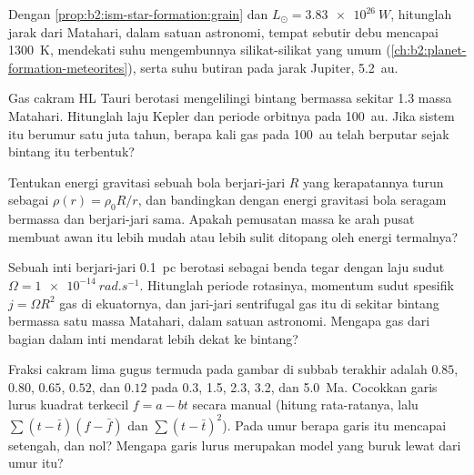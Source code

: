 \begin{exercise}[$\star\star$]\label{exo:b2:ism-star-formation:8}
Dengan \cref{prop:b2:ism-star-formation:grain} dan $L_\odot = \qty{3.83e26}{W}$,
hitunglah jarak dari Matahari, dalam satuan astronomi, tempat sebutir debu
mencapai \qty{1300}{K}, mendekati suhu mengembunnya silikat-silikat yang umum
(\cref{ch:b2:planet-formation-meteorites}), serta
suhu butiran pada jarak Jupiter, \qty{5.2}{au}.
\end{exercise}

\begin{exercise}[$\star\star$]\label{exo:b2:ism-star-formation:9}
Gas cakram HL Tauri berotasi mengelilingi bintang bermassa sekitar \num{1.3} massa
Matahari. Hitunglah laju Kepler dan periode orbitnya pada \qty{100}{au}.
Jika sistem itu berumur satu juta tahun, berapa kali gas pada
\qty{100}{au} telah berputar sejak bintang itu terbentuk?
\end{exercise}

\begin{exercise}[$\star\star\star$]\label{exo:b2:ism-star-formation:10}
Tentukan energi gravitasi sebuah bola berjari-jari $R$ yang kerapatannya
turun sebagai $\rho(r) = \rho_0 R/r$, dan bandingkan dengan energi gravitasi bola seragam
bermassa dan berjari-jari sama. Apakah pemusatan massa ke arah pusat membuat
awan itu lebih mudah atau lebih sulit ditopang oleh energi termalnya?
\end{exercise}

\begin{exercise}[$\star\star\star$]\label{exo:b2:ism-star-formation:11}
Sebuah inti berjari-jari \qty{0.1}{pc} berotasi sebagai benda tegar dengan laju sudut
$\Omega = \qty{1e-14}{rad.s^{-1}}$. Hitunglah periode rotasinya, momentum sudut
spesifik $j = \Omega R^2$ gas di ekuatornya, dan jari-jari sentrifugal
gas itu di sekitar bintang bermassa satu massa Matahari, dalam satuan astronomi.
Mengapa gas dari bagian dalam inti mendarat lebih dekat ke bintang?
\end{exercise}

\begin{exercise}[$\star\star\star$]\label{exo:b2:ism-star-formation:12}
Fraksi cakram lima gugus termuda pada gambar di subbab terakhir
adalah $0.85$, $0.80$, $0.65$, $0.52$, dan $0.12$ pada 0.3, 1.5, 2.3, 3.2, dan
\qty{5.0}{Ma}. Cocokkan garis lurus kuadrat terkecil $f = a - bt$ secara manual
(hitung rata-ratanya, lalu $\sum(t - \bar t)(f - \bar f)$ dan
$\sum(t - \bar t)^2$). Pada umur berapa garis itu mencapai setengah, dan nol? Mengapa
garis lurus merupakan model yang buruk lewat dari umur itu?
\end{exercise}

